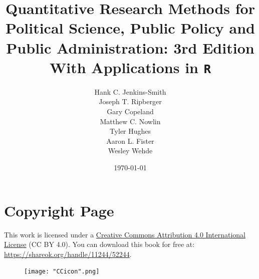 \documentclass[11pt,openany]{book}\usepackage[]{graphicx}\usepackage[]{color}
\begin{document}



\title{Quantitative Research Methods for Political Science, Public Policy and Public Administration: 3rd Edition\\
  \LARGE With Applications in \texttt{R}}

\author{Hank C. Jenkins-Smith\\ 
Joseph T. Ripberger\\
Gary Copeland\\
Matthew C. Nowlin\\
Tyler Hughes\\
Aaron L. Fister\\
Wesley Wehde}

\date{\today}

\maketitle



\newpage
\chapter*{Copyright Page}

This work is licensed under a \href{https://creativecommons.org/licenses/by/4.0/}{Creative Commons Attribution 4.0 International License} (CC BY 4.0). You can download this book for free at: \url{https://shareok.org/handle/11244/52244}.  

\begin{figure}[h]
\centerline{\texttt{[image: "CCicon".png]}}
\label{fig:cc}
\end{figure}


{\singlespacing
  \tableofcontents
  
  \listoftables
  }



\newpage
\end{document}
